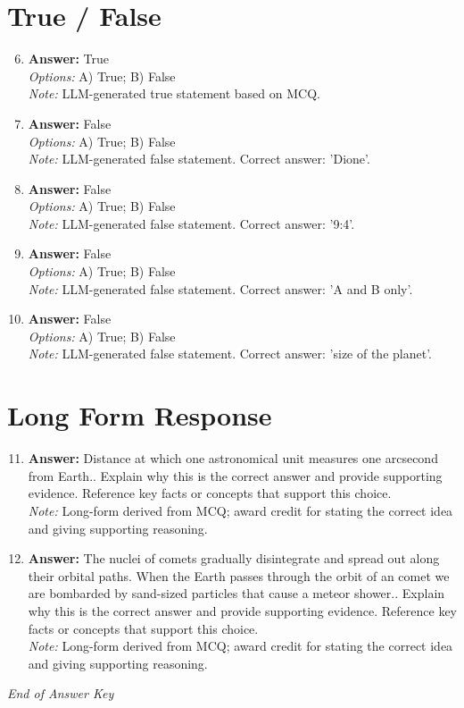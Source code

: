 \documentclass[12pt]{article}
\begin{document}
\section*{True / False}
\begin{enumerate}[label=\arabic*.]
\setcounter{enumi}{5}
\item \textbf{Answer:} True
\\ \textit{Options:} A) True; B) False
\\ \textit{Note:} LLM-generated true statement based on MCQ.
\item \textbf{Answer:} False
\\ \textit{Options:} A) True; B) False
\\ \textit{Note:} LLM-generated false statement. Correct answer: 'Dione'.
\item \textbf{Answer:} False
\\ \textit{Options:} A) True; B) False
\\ \textit{Note:} LLM-generated false statement. Correct answer: '9:4'.
\item \textbf{Answer:} False
\\ \textit{Options:} A) True; B) False
\\ \textit{Note:} LLM-generated false statement. Correct answer: 'A and B only'.
\item \textbf{Answer:} False
\\ \textit{Options:} A) True; B) False
\\ \textit{Note:} LLM-generated false statement. Correct answer: 'size of the planet'.
\end{enumerate}

\section*{Long Form Response}
\begin{enumerate}[label=\arabic*.]
\setcounter{enumi}{10}
\item \textbf{Answer:} Distance at which one astronomical unit measures one arcsecond from Earth.. Explain why this is the correct answer and provide supporting evidence. Reference key facts or concepts that support this choice.
\\ \textit{Note:} Long-form derived from MCQ; award credit for stating the correct idea and giving supporting reasoning.
\item \textbf{Answer:} The nuclei of comets gradually disintegrate and spread out along their orbital paths. When the Earth passes through the orbit of an comet we are bombarded by sand-sized particles that cause a meteor shower.. Explain why this is the correct answer and provide supporting evidence. Reference key facts or concepts that support this choice.
\\ \textit{Note:} Long-form derived from MCQ; award credit for stating the correct idea and giving supporting reasoning.
\end{enumerate}

\vfill
\noindent\textit{End of Answer Key}
\end{document}
